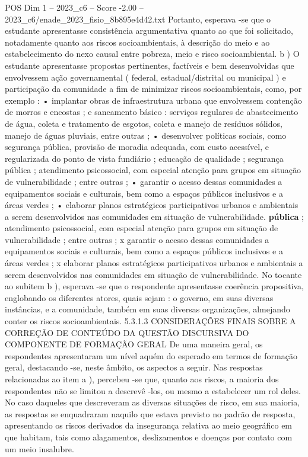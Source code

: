 \begin{textsample}{POS Dim 1 – 2023\_c6 – Score -2.00 – 2023\_c6/enade\_2023\_fisio\_8b895e4d42.txt}
Portanto, esperava -se que o estudante apresentasse consistência argumentativa quanto ao que foi solicitado, notadamente quanto aos riscos socioambientais, à descrição do meio e ao estabelecimento do nexo causal entre pobreza, meio e risco socioambiental. b ) O estudante apresentasse propostas pertinentes, factíveis e bem desenvolvidas que envolvessem ação governamental ( federal, estadual/distrital ou municipal ) e participação da comunidade a fim de minimizar riscos socioambientais, como, por exemplo : • implantar obras de infraestrutura urbana que envolvessem contenção de morros e encostas ; e saneamento básico : serviços regulares de abastecimento de água, coleta e tratamento de esgotos, coleta e manejo de resíduos sólidos, manejo de águas pluviais, entre outras ; • desenvolver políticas sociais, como segurança pública, provisão de moradia adequada, com custo acessível, e regularizada do ponto de vista fundiário ; educação de qualidade ; segurança pública ; atendimento psicossocial, com especial atenção para grupos em situação de vulnerabilidade ; entre outras ; • garantir o acesso dessas comunidades a equipamentos sociais e culturais, bem como a espaços públicos inclusivos e a áreas verdes ; • elaborar planos estratégicos participativos urbanos e ambientais a serem desenvolvidos nas comunidades em situação de vulnerabilidade. \textbf{pública} ; atendimento psicossocial, com especial atenção para grupos em situação de vulnerabilidade ; entre outras ; x garantir o acesso dessas comunidades a equipamentos sociais e culturais, bem como a espaços públicos inclusivos e a áreas verdes ; x elaborar planos estratégicos participativos urbanos e ambientais a serem desenvolvidos nas comunidades em situação de vulnerabilidade.
No tocante ao subitem b ), esperava -se que o respondente apresentasse coerência propositiva, englobando os diferentes atores, quais sejam : o governo, em suas diversas instâncias, e a comunidade, também em suas diversas organizações, almejando conter os riscos socioambientais. 5.3.1.3 CONSIDERAÇÕES FINAIS SOBRE A CORREÇÃO DE CONTEÚDO DA QUESTÃO DISCURSIVA DO COMPONENTE DE FORMAÇÃO GERAL De uma maneira geral, os respondentes apresentaram um nível aquém do esperado em termos de formação geral, destacando -se, neste âmbito, os aspectos a seguir.
Nas respostas relacionadas ao item a ), percebeu -se que, quanto aos riscos, a maioria dos respondentes não se limitou a descrevê -los, ou mesmo a estabelecer um rol deles.
No caso daqueles que descreveram as diversas situações de risco, em sua maioria, as respostas se enquadraram naquilo que estava previsto no padrão de resposta, apresentando os riscos derivados da insegurança relativa ao meio geográfico em que habitam, tais como alagamentos, deslizamentos e doenças por contato com um meio insalubre.

\end{textsample}
